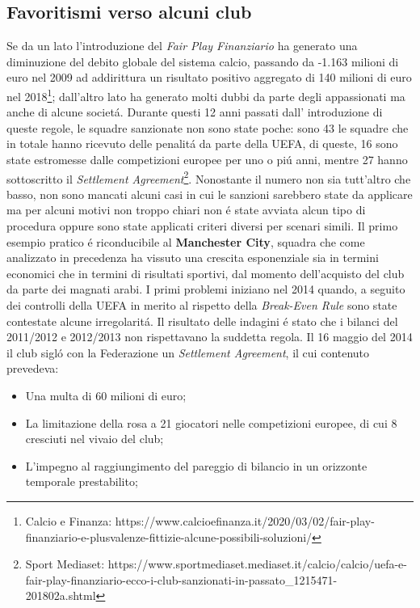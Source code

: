 \documentclass[
    corpo=12pt,
    oneside,
    evenboxes,
    tipotesi=triennale,
    stile=classica,
    oldstyle,
    autoretitolo,
    greek,
]{toptesi}
\begin{document}
\begin{interlinea}{1.5}
\section{Favoritismi verso alcuni club}
Se da un lato l'introduzione del \emph{Fair Play Finanziario} ha generato una diminuzione del debito globale del sistema calcio,
passando da -1.163 milioni di euro nel 2009 ad addirittura un risultato positivo aggregato di 140 milioni di euro nel 2018\footnote{Calcio e Finanza: https://www.calcioefinanza.it/2020/03/02/fair-play-finanziario-e-plusvalenze-fittizie-alcune-possibili-soluzioni/};
dall'altro lato ha generato molti dubbi da parte degli appassionati ma anche di alcune societ\'a. Durante questi 12 anni passati dall'
introduzione di queste regole, le squadre sanzionate non sono state poche: sono 43 le squadre che in totale hanno ricevuto delle penalit\'a
da parte della UEFA, di queste, 16 sono state estromesse dalle competizioni europee per uno o pi\'u anni, mentre 27 hanno sottoscritto il 
\emph{Settlement Agreement}\footnote{Sport Mediaset: https://www.sportmediaset.mediaset.it/calcio/calcio/uefa-e-fair-play-finanziario-ecco-i-club-sanzionati-in-passato\_1215471-201802a.shtml}. 
Nonostante il numero non sia tutt'altro che basso, non sono mancati alcuni casi in cui le sanzioni sarebbero state da
applicare ma per alcuni motivi non troppo chiari non \'e state avviata alcun tipo di procedura oppure sono state applicati criteri diversi per
scenari simili.\newline
Il primo esempio pratico \'e riconducibile al \textbf{Manchester City}, squadra che come analizzato in precedenza ha vissuto una crescita esponenziale
sia in termini economici che in termini di risultati sportivi, dal momento dell'acquisto del club da parte dei magnati arabi. I primi problemi
iniziano nel 2014 quando, a seguito dei controlli della UEFA in merito al rispetto della \emph{Break-Even Rule} sono state contestate alcune irregolarit\'a.
Il risultato delle indagini \'e stato che i bilanci del 2011/2012 e 2012/2013 non rispettavano la suddetta regola. Il 16 maggio del 2014 il club sigl\'o con la Federazione
un \emph{Settlement Agreement}, il cui contenuto prevedeva:
\begin{itemize}
    \item Una multa di 60 milioni di euro;
    \item La limitazione della rosa a 21 giocatori nelle competizioni europee, di cui 8 cresciuti nel vivaio del club;
    \item L’impegno al raggiungimento del pareggio di bilancio in un orizzonte temporale prestabilito;

\end{itemize}
\end{interlinea}
\end{document}
